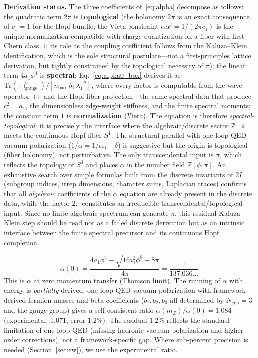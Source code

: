 \documentclass[12pt,a4paper]{article}
\theoremstyle{definition}
\begin{document}
\textbf{Derivation status.}  The three coefficients of~\eqref{eq:alpha} decompose as follows: the quadratic term $2\pi$ is \textbf{topological} (the holonomy $2\pi$ is an exact consequence of $c_1 = 1$ for the Hopf bundle; the Vieta constraint $\alpha\alpha' = 1/(2\pi c_1)$ is the unique normalization compatible with charge quantization on a fiber with first Chern class~$1$; its role as the coupling coefficient follows from the Kaluza--Klein identification, which is the sole structural postulate---not a first-principles lattice derivation, but tightly constrained by the topological necessity of $\pi$); the linear term $4a_1\phi^4$ is \textbf{spectral}: Eq.~\eqref{eq:alpha0_box} derives it as $\mathrm{Tr}(\Box_{\mathrm{gauge}}^2)/[n_{\mathrm{base}}\,b_1\,\lambda_1^{-2}]$, where every factor is computable from the wave operator $\Box$ and the Hopf fiber projection---the same spectral data that produce $c^2 = a_1$, the dimensionless edge-weight stiffness, and the finite spectral moments; the constant term $1$ is \textbf{normalization} (Vieta).  The equation is therefore \emph{spectral-topological}: it is precisely the interface where the algebraic/discrete sector $\mathbb{Z}[\phi]$ meets the continuous Hopf fiber $S^1$.  The structural parallel with one-loop QED vacuum polarization ($1/\alpha = 1/\alpha_0 - \delta$) is suggestive but the origin is topological (fiber holonomy), not perturbative.  The only transcendental input is $\pi$, which reflects the topology of $S^3$ and places $\alpha$ in the number field $\mathbb{Z}[\phi, \pi]$.  An exhaustive search over simple formulas built from the discrete invariants of $2I$ (subgroup indices, irrep dimensions, character sums, Laplacian traces) confirms that all \emph{algebraic} coefficients of the $\alpha$ equation are already present in the discrete data, while the factor $2\pi$ constitutes an irreducible transcendental/topological input.  Since no finite algebraic spectrum can generate $\pi$, this residual Kaluza--Klein step should be read not as a failed discrete derivation but as an intrinsic interface between the finite spectral precursor and its continuous Hopf completion.

\begin{equation}
\alpha(0) = \frac{4a_1\phi^4 - \sqrt{16a_1^2\phi^8 - 8\pi}}{4\pi} = \frac{1}{137.036\ldots}
\end{equation}
This is $\alpha$ at zero momentum transfer (Thomson limit).  The running of $\alpha$ with energy is \emph{partially} derived: one-loop QED vacuum polarization with framework-derived fermion masses and beta coefficients ($b_1, b_2, b_3$ all determined by $N_{\text{gen}} = 3$ and the gauge group) gives a self-consistent ratio $\alpha(m_Z)/\alpha(0) = 1.084$ (experimental: $1.071$, error $1.2\%$).  The residual $1.2\%$ reflects the standard limitation of one-loop QED (missing hadronic vacuum polarization and higher-order corrections), not a framework-specific gap.  Where sub-percent precision is needed (Section~\ref{sec:ew}), we use the experimental ratio.
\end{document}
